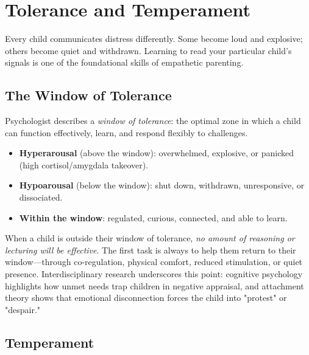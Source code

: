 \section{Tolerance and Temperament}

Every child communicates distress differently. 
Some become loud and explosive; others become quiet and withdrawn. 
Learning to read your particular child's signals is one of the foundational skills of empathetic parenting.

\subsection{The Window of Tolerance}

Psychologist \citet{siegel2011} describes a \textit{window of tolerance}: the optimal zone in which a child can function effectively, learn, and respond flexibly to challenges.
\begin{itemize}
  \item \textbf{Hyperarousal} (above the window): overwhelmed, explosive, or panicked (high cortisol\slash amygdala takeover).
  \item \textbf{Hypoarousal} (below the window): shut down, withdrawn, unresponsive, or dissociated.
  \item \textbf{Within the window}: regulated, curious, connected, and able to learn.
\end{itemize}

When a child is outside their window of tolerance, \textit{no amount of reasoning or lecturing will be effective}. The first task is always to help them return to their window---through co-regulation, physical comfort, reduced stimulation, or quiet presence. 
Interdisciplinary research underscores this point: cognitive psychology \citep{lazarus1991} highlights how unmet needs trap children in negative appraisal, and attachment theory \citep{bowlby1969} shows that emotional disconnection forces the child into "protest" or "despair."

\subsection{Temperament}

